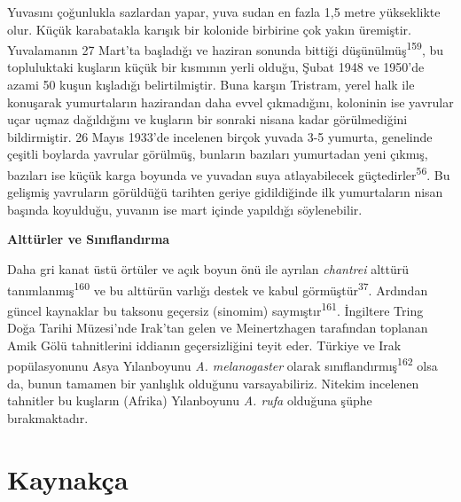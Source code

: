 \documentclass[
  letterpaper,
  DIV=11,
  numbers=noendperiod]{scrreprt}
\begin{document}
Yuvasını çoğunlukla sazlardan yapar, yuva sudan en fazla 1,5 metre
yükseklikte olur. Küçük karabatakla karışık bir kolonide birbirine çok
yakın üremiştir. Yuvalamanın 27 Mart'ta başladığı ve haziran sonunda
bittiği düşünülmüş\textsuperscript{159}, bu topluluktaki kuşların küçük
bir kısmının yerli olduğu, Şubat 1948 ve 1950'de azami 50 kuşun
kışladığı belirtilmiştir. Buna karşın Tristram, yerel halk ile konuşarak
yumurtaların hazirandan daha evvel çıkmadığını, koloninin ise yavrular
uçar uçmaz dağıldığını ve kuşların bir sonraki nisana kadar
görülmediğini bildirmiştir. 26 Mayıs 1933'de incelenen birçok yuvada 3-5
yumurta, genelinde çeşitli boylarda yavrular görülmüş, bunların bazıları
yumurtadan yeni çıkmış, bazıları ise küçük karga boyunda ve yuvadan suya
atlayabilecek güçtedirler\textsuperscript{56}. Bu gelişmiş yavruların
görüldüğü tarihten geriye gidildiğinde ilk yumurtaların nisan başında
koyulduğu, yuvanın ise mart içinde yapıldığı söylenebilir.

\textbf{Alttürler ve Sınıflandırma}

Daha gri kanat üstü örtüler ve açık boyun önü ile ayrılan
\emph{chantrei} alttürü tanımlanmış\textsuperscript{160} ve bu alttürün
varlığı destek ve kabul görmüştür\textsuperscript{37}. Ardından güncel
kaynaklar bu taksonu geçersiz (sinomim) saymıştır\textsuperscript{161}.
İngiltere Tring Doğa Tarihi Müzesi'nde Irak'tan gelen ve Meinertzhagen
tarafından toplanan Amik Gölü tahnitlerini iddianın geçersizliğini teyit
eder. Türkiye ve Irak popülasyonunu Asya Yılanboyunu \emph{A.
melanogaster} olarak sınıflandırmış\textsuperscript{162} olsa da, bunun
tamamen bir yanlışlık olduğunu varsayabiliriz. Nitekim incelenen
tahnitler bu kuşların (Afrika) Yılanboyunu \emph{A. rufa} olduğuna şüphe
bırakmaktadır.


\chapter*{Kaynakça}\label{kaynakuxe7a}

\end{document}

